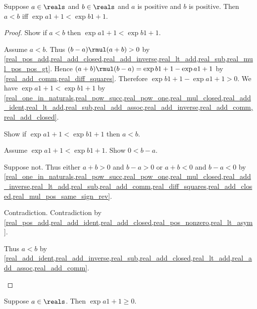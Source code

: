\begin{proposition}\label{real_pos_lt_iff_sq_lt}
    Suppose $a\in\reals$ and $b\in\reals$ and $a$ is positive and $b$ is positive.
    Then $a < b$ iff $\exp{a}{1+1} < \exp{b}{1+1}$.
\end{proposition}
\begin{proof}
    Show if $a < b$ then $\exp{a}{1+1} < \exp{b}{1+1}$.
    \begin{subproof}
        Assume $a < b$.
        Thus $(b - a) \rmul (a + b) > 0$ by \cref{real_pos_add,real_add_closed,real_add_inverse,real_lt_add,real_sub,real_mul_pos_pos_gt}.
        Hence $(a + b) \rmul (b - a) = \exp{b}{1+1} - \exp{a}{1+1}$ by \cref{real_add_comm,real_diff_squares}.
        Therefore $\exp{b}{1+1} - \exp{a}{1+1} > 0$.
        We have $\exp{a}{1+1} < \exp{b}{1+1}$ by \cref{real_one_in_naturals,real_pow_succ,real_pow_one,real_mul_closed,real_add_ident,real_lt_add,real_sub,real_add_assoc,real_add_inverse,real_add_comm,real_add_closed}.
    \end{subproof}
    Show if $\exp{a}{1+1} < \exp{b}{1+1}$ then $a < b$.
    \begin{subproof}
        Assume $\exp{a}{1+1} < \exp{b}{1+1}$.
        Show $0 < b - a$.
        \begin{subproof}
            Suppose not.
            Thus either $a + b > 0$ and $b - a > 0$ or $a + b < 0$ and $b - a < 0$ by \cref{real_one_in_naturals,real_pow_succ,real_pow_one,real_mul_closed,real_add_inverse,real_lt_add,real_sub,real_add_comm,real_diff_squares,real_add_closed,real_mul_pos_same_sign_rev}.
            \begin{byCase}
                Contradiction.
                Contradiction by \cref{real_pos_add,real_add_ident,real_add_closed,real_pos_nonzero,real_lt_asym}.
            \end{byCase}
        \end{subproof}
        Thus $a < b$ by \cref{real_add_ident,real_add_inverse,real_sub,real_add_closed,real_lt_add,real_add_assoc,real_add_comm}.
    \end{subproof}
\end{proof}

\begin{proposition}\label{real_sq_nonnegative}
    Suppose $a\in\reals$.
    Then $\exp{a}{1+1} \geq 0$.
\end{proposition}

